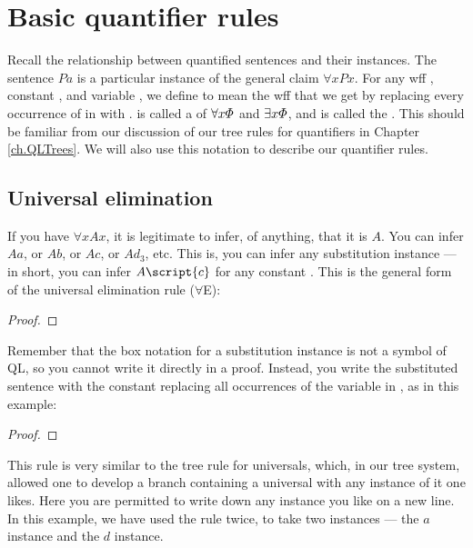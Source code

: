 \section{Basic quantifier rules}

Recall the relationship between quantified sentences and their instances. The sentence $Pa$ is a particular instance of the general claim $\forall x Px$. For any wff \metaA{}, constant , and variable , we define \metaA{} to mean the wff that we get by replacing every occurrence of  in \metaA{} with . \metaA{} is called a  of $\forall x\varPhi{}$ and $\exists x\varPhi{}$, and  is called the . This should be familiar from our discussion of our tree rules for quantifiers in Chapter \ref{ch.QLTrees}. We will also use this notation to describe our quantifier rules.



\subsection{Universal elimination}

If you have $\forall x Ax$, it is legitimate to infer, of anything, that it is $A$. You can infer $Aa$, or $Ab$, or $Ac$, or $Ad_3$, etc. This is, you can infer any substitution instance --- in short, you can infer $A\script{c}$ for any constant . This is the general form of the universal elimination rule ($\forall$E):

\begin{proof}
	 
\end{proof}


Remember that the box notation for a substitution instance is not a symbol of QL, so you cannot write it directly in a proof. Instead, you write the substituted sentence with the constant  replacing all occurrences of the variable  in \metaA{}, as in this example:

\begin{proof}
	 
	 
\end{proof}

This rule is very similar to the tree rule for universals, which, in our tree system, allowed one to develop a branch containing a universal with any instance of it one likes. Here you are permitted to write down any instance you like on a new line. In this example, we have used the rule twice, to take two instances --- the $a$ instance and the $d$ instance.

